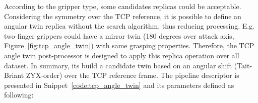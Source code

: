 According to the gripper type, some candidates replicas could be acceptable. Considering the symmetry over the TCP reference, it is possible to define an angular twin replica without the search algorithm, thus reducing processing. E.g. two-finger grippers could have a mirror twin (180 degrees over attack axis, Figure~\ref{fig:tcp_angle_twin}) with same grasping properties. Therefore, the TCP angle twin post-processor is designed to apply this replica operation over all dataset. In summary, its build a candidate twin based on an angular shift (Tait-Briant ZYX-order) over the TCP reference frame.  The pipeline descriptor is presented in Snippet~\ref{code:tcp_angle_twin} and its parameters defined as following:

\begin{figure}[h!]
\end{figure}

\begin{snippet}[h!]
\centering
{}
\caption{TCP angle twin post-processor YAML descriptor example}
\label{code:tcp_angle_twin}
\end{snippet}

